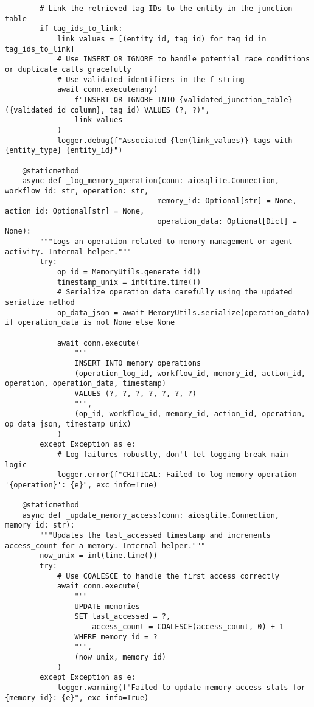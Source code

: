 \documentclass[12pt,a4paper]{article}
\begin{document}
\begin{pageablecode}
\begin{verbatim}
        # Link the retrieved tag IDs to the entity in the junction table
        if tag_ids_to_link:
            link_values = [(entity_id, tag_id) for tag_id in tag_ids_to_link]
            # Use INSERT OR IGNORE to handle potential race conditions or duplicate calls gracefully
            # Use validated identifiers in the f-string
            await conn.executemany(
                f"INSERT OR IGNORE INTO {validated_junction_table} ({validated_id_column}, tag_id) VALUES (?, ?)",
                link_values
            )
            logger.debug(f"Associated {len(link_values)} tags with {entity_type} {entity_id}")

    @staticmethod
    async def _log_memory_operation(conn: aiosqlite.Connection, workflow_id: str, operation: str,
                                   memory_id: Optional[str] = None, action_id: Optional[str] = None,
                                   operation_data: Optional[Dict] = None):
        """Logs an operation related to memory management or agent activity. Internal helper."""
        try:
            op_id = MemoryUtils.generate_id()
            timestamp_unix = int(time.time())
            # Serialize operation_data carefully using the updated serialize method
            op_data_json = await MemoryUtils.serialize(operation_data) if operation_data is not None else None

            await conn.execute(
                """
                INSERT INTO memory_operations
                (operation_log_id, workflow_id, memory_id, action_id, operation, operation_data, timestamp)
                VALUES (?, ?, ?, ?, ?, ?, ?)
                """,
                (op_id, workflow_id, memory_id, action_id, operation, op_data_json, timestamp_unix)
            )
        except Exception as e:
            # Log failures robustly, don't let logging break main logic
            logger.error(f"CRITICAL: Failed to log memory operation '{operation}': {e}", exc_info=True)

    @staticmethod
    async def _update_memory_access(conn: aiosqlite.Connection, memory_id: str):
        """Updates the last_accessed timestamp and increments access_count for a memory. Internal helper."""
        now_unix = int(time.time())
        try:
            # Use COALESCE to handle the first access correctly
            await conn.execute(
                """
                UPDATE memories
                SET last_accessed = ?,
                    access_count = COALESCE(access_count, 0) + 1
                WHERE memory_id = ?
                """,
                (now_unix, memory_id)
            )
        except Exception as e:
            logger.warning(f"Failed to update memory access stats for {memory_id}: {e}", exc_info=True)


\end{verbatim}
\end{pageablecode}
\end{document}
